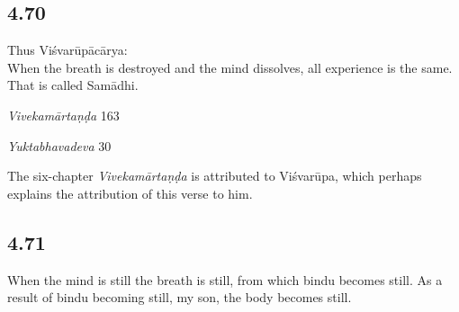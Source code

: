 \begin{ekdosis}

\subsection*{4.70}
\begin{translation}[hp04_070]
Thus Viśvarūpācārya:\\
When the breath is destroyed and the mind dissolves, all experience is the same. That is called Samādhi.
\end{translation}

\begin{sources}[hp04_070]
\emph{Vivekamārtaṇḍa} 163
\begin{versinnote}
\end{versinnote}
\end{sources}

\begin{testimonia}[hp04_070]
\emph{Yuktabhavadeva} 30
\begin{versinnote}
\tl{\var{yadā ] tadā}\\!}
\end{versinnote}
\end{testimonia}

\begin{philcomm}[hp04_070]
The six-chapter \emph{Vivekamārtaṇḍa} is attributed to Viśvarūpa, which perhaps explains the attribution of this verse to him.
\end{philcomm}

\subsection*{4.71}
\begin{translation}[hp04_071]
When the mind is still the breath is still, from which bindu becomes still.  As a result of bindu becoming still, my son, the body becomes still.
\end{translation}


\end{ekdosis}
